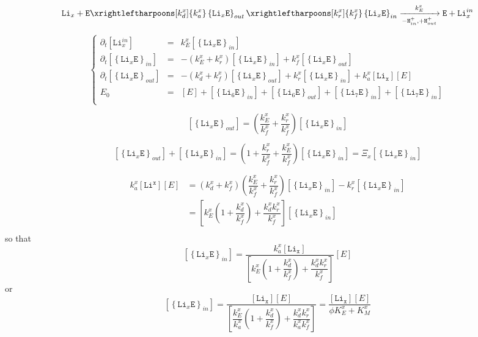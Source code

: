 \documentclass[aps,onecolumn]{revtex4}
\newcommand{\mychem}[1]{\mathtt{#1}}
\newcommand{\myconc}[1]{\left\lbrack{#1}\right\rbrack}
\newcommand{\LiEin}[1]{\myconc{\left\lbrace\mychem{Li}_{#1}\mychem{E}\right\rbrace_{in}}}
\newcommand{\LiEout}[1]{\myconc{\left\lbrace\mychem{Li}_{#1}\mychem{E}\right\rbrace_{out}}}
\begin{document}
\begin{equation}
	 \mychem{Li}_{x} +  \mychem{E}  
	 \xrightleftharpoons[k_d^x]{k_a^x} 
	 \left\lbrace\mychem{Li}_{x}\mychem{E}\right\rbrace_{out} 
	  \xrightleftharpoons[k_r^x]{k_f^x} 
	  \left\lbrace\mychem{Li}_{x}\mychem{E}\right\rbrace_{in}  
	   \xrightarrow[-\mychem{H}^+_{in},+\mychem{H}^+_{out}]{k_E^x} \mychem{E}  + \mychem{Li}_{x}^{in}
\end{equation}

\begin{equation}
\left\lbrace
\begin{array}{rcl}
	\partial_t \myconc{\mychem{Li}^{in}_x} & = & k_E^x \LiEin{x} \\
	\partial_t \LiEin{x} & = & 
	-\left(k_E^x+k_r^x\right) \LiEin{x}+k_f^x \LiEout{x}
	\\
	\partial_t \LiEout{x} & = &
	-\left(k_d^x+k_f^x\right) \LiEout{x}
	+k_r^x \LiEin{x}
	+k_a^x \myconc{\mychem{Li_x}} \myconc{E}
	\\
	E_0 & = & \myconc{E} + \LiEin{6} + \LiEout{6} + \LiEin{7}+\LiEin{7}\\
\end{array}
\right.
\end{equation}

\begin{equation}
	\LiEout{x} = \left(\dfrac{k_E^x}{k_f^x} + \dfrac{k_r^x}{k_f^x} \right) \LiEin{x}	
\end{equation}



\begin{equation}
	\LiEout{x} + \LiEin{x} = \left(1+\dfrac{k_r^x}{k_f^x} +\dfrac{k_E^x}{k_f^x}  \right) \LiEin{x} = \Xi_x \LiEin{x}
\end{equation}

\begin{equation}
\begin{array}{rl}
k_a^x \myconc{\mychem{Li^x}} \myconc{E} & =  \left(k_d^x+k_f^x\right) \left(\dfrac{k_E^x}{k_f^x} + \dfrac{k_r^x}{k_f^x} \right) \LiEin{x} - k_r^x \LiEin{x}\\
& = \left\lbrack k_E^x \left(1+\dfrac{k_d^x}{k_f^x} \right) + \dfrac{k_d^xk_r^x}{k_f^x} \right\rbrack \LiEin{x}\\
\end{array}
\end{equation}
so that
\begin{equation}
	\LiEin{x} = \dfrac{k_a^x \myconc{\mychem{Li_x}} }{\left\lbrack k_E^x \left(1+\dfrac{k_d^x}{k_f^x} \right) + \dfrac{k_d^xk_r^x}{k_f^x} \right\rbrack} \myconc{E}
\end{equation}
or
\begin{equation}
	\LiEin{x} = \dfrac{\myconc{\mychem{Li_x}} \myconc{E}}{\left\lbrack \dfrac{k_E^x}{k_a^x} \left(1+\dfrac{k_d^x}{k_f^x} \right) + \dfrac{k_d^xk_r^x}{k_a^xk_f^x} \right\rbrack}
	= \dfrac{\myconc{\mychem{Li_x}}\myconc{E}}{\phi K_E^x + K_M^x}
\end{equation}
\end{document}
